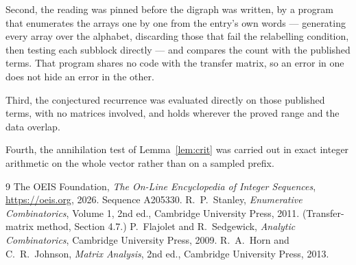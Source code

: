 \documentclass[11pt,a4paper]{article}
\theoremstyle{plain}
\theoremstyle{definition}
\begin{document}
Second, the reading was pinned before the digraph was written, by a program that enumerates
the arrays one by one from the entry's own words --- generating every array over the
alphabet, discarding those that fail the relabelling condition, then testing each subblock
directly --- and compares the count with the published terms. That program shares no code
with the transfer matrix, so an error in one does not hide an error in the other.

Third, the conjectured recurrence was evaluated directly on those published terms, with no
matrices involved, and holds wherever the proved range and the data overlap.

Fourth, the annihilation test of Lemma~\ref{lem:crit} was carried out in exact integer
arithmetic on the whole vector rather than on a sampled prefix.

\begin{thebibliography}{9}
 The OEIS Foundation, \emph{The On-Line Encyclopedia of Integer
Sequences}, \url{https://oeis.org}, 2026. Sequence A205330.
 R.~P.~Stanley, \emph{Enumerative Combinatorics}, Volume 1, 2nd ed.,
Cambridge University Press, 2011. (Transfer-matrix method, Section 4.7.)
 P.~Flajolet and R.~Sedgewick, \emph{Analytic Combinatorics}, Cambridge
University Press, 2009.
 R.~A.~Horn and C.~R.~Johnson, \emph{Matrix Analysis}, 2nd ed., Cambridge
University Press, 2013.
\end{thebibliography}
\end{document}
